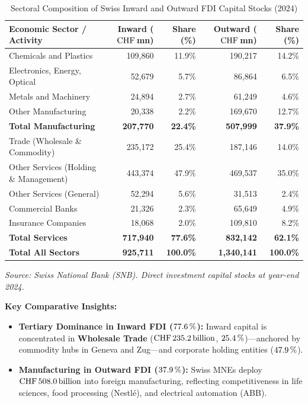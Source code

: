 \begin{table}[H]
\centering
\small
\caption{Sectoral Composition of Swiss Inward and Outward FDI Capital Stocks (2024)}
\label{tab:combined_sector}
\renewcommand{\arraystretch}{1.12}
\begin{tabularx}{\textwidth}{>{\raggedright}X r r r r}
\toprule
\rowcolor{tableheadbg}
\textbf{Economic Sector / Activity} & \textbf{Inward ($\text{CHF}$\,mn)} & \textbf{Share (\%)} & \textbf{Outward ($\text{CHF}$\,mn)} & \textbf{Share (\%)} \\
\midrule
Chemicals and Plastics & 109,860 & 11.9\% & 190,217 & 14.2\% \\
Electronics, Energy, Optical & 52,679 & 5.7\% & 86,864 & 6.5\% \\
Metals and Machinery & 24,894 & 2.7\% & 61,249 & 4.6\% \\
Other Manufacturing & 20,338 & 2.2\% & 169,670 & 12.7\% \\
\midrule
\rowcolor{tablerowbg}
\textbf{Total Manufacturing} & \textbf{207,770} & \textbf{22.4\%} & \textbf{507,999} & \textbf{37.9\%} \\
\midrule
Trade (Wholesale \& Commodity) & 235,172 & 25.4\% & 187,146 & 14.0\% \\
Other Services (Holding \& Management) & 443,374 & 47.9\% & 469,537 & 35.0\% \\
Other Services (General) & 52,294 & 5.6\% & 31,513 & 2.4\% \\
Commercial Banks & 21,326 & 2.3\% & 65,649 & 4.9\% \\
Insurance Companies & 18,068 & 2.0\% & 109,810 & 8.2\% \\
\midrule
\rowcolor{tablerowbg}
\textbf{Total Services} & \textbf{717,940} & \textbf{77.6\%} & \textbf{832,142} & \textbf{62.1\%} \\
\midrule
\textbf{Total All Sectors} & \textbf{925,711} & \textbf{100.0\%} & \textbf{1,340,141} & \textbf{100.0\%} \\
\bottomrule
\end{tabularx}
\par\vspace{0.3em}
\footnotesize
\textit{Source: Swiss National Bank (SNB). Direct investment capital stocks at year-end 2024.}
\normalsize
\end{table}

\noindent\textbf{Key Comparative Insights:}
\begin{itemize}[leftmargin=1.5em, itemsep=1.5pt]
    \item \textbf{Tertiary Dominance in Inward FDI ($77.6\,\%$):} Inward capital is concentrated in \textbf{Wholesale Trade} ($\text{CHF}\,235.2\,\text{billion}$, $25.4\,\%$)---anchored by commodity hubs in Geneva and Zug---and corporate holding entities ($47.9\,\%$).
    \item \textbf{Manufacturing in Outward FDI ($37.9\,\%$):} Swiss MNEs deploy $\text{CHF}\,508.0\,\text{billion}$ into foreign manufacturing, reflecting competitiveness in life sciences, food processing (Nestlé), and electrical automation (ABB).
\end{itemize}

